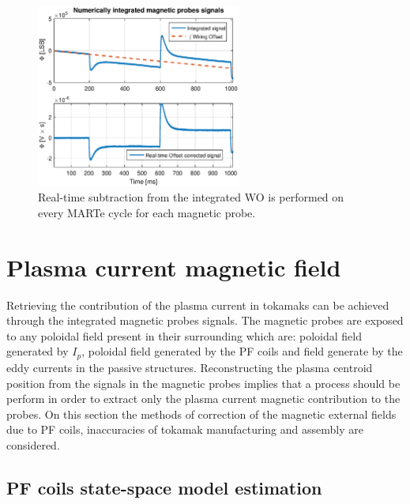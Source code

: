 \begin{figure}[htbp]
	\centering
	\includegraphics[width=0.6\textwidth]{Chp4/offset_remov_1}
	\caption{\label{offset_remove} Real-time subtraction from the integrated WO is performed on every MARTe cycle for each magnetic probe.  }
\end{figure}

%


\section{Plasma current magnetic field }

Retrieving the contribution of the plasma current in tokamaks can be achieved through the integrated magnetic probes signals. The magnetic probes are exposed to any poloidal field present in their surrounding which are: poloidal field generated by $I_p$, poloidal field generated by the PF coils and field generate by the eddy currents in the passive structures. Reconstructing the plasma centroid position from the signals in the magnetic probes implies that a process should be perform in order to extract only the plasma current magnetic contribution to the probes.  On this section the methods of correction of the magnetic external fields due to PF coils, inaccuracies of tokamak manufacturing and assembly are considered. \smallskip


\subsection{PF coils state-space model estimation}

